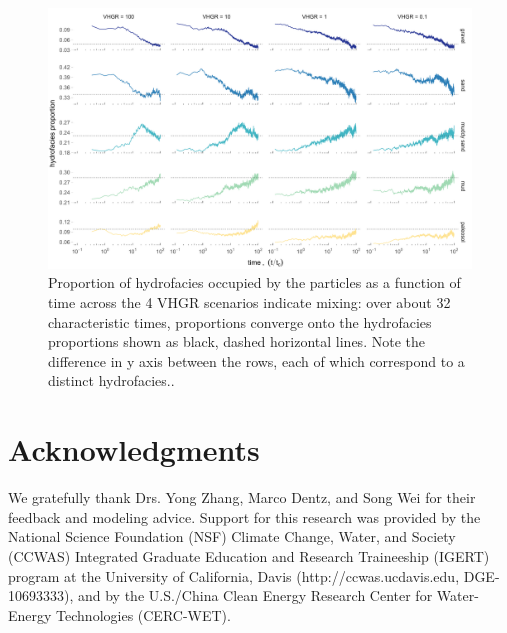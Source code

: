 \begin{figure}[H]
  \includegraphics[width=\textwidth]{ch4_appendix_figs/phf_over_time_00_03_ai.pdf}
  \caption{Proportion of hydrofacies occupied by the particles as a function of time across the 4 VHGR scenarios indicate mixing: over about 32 characteristic times, proportions converge onto the hydrofacies proportions shown as black, dashed horizontal lines. Note the difference in y axis between the rows, each of which correspond to a distinct hydrofacies..}
  \label{ap_c_heads_vhgr}
\end{figure}



\clearpage



\section{Acknowledgments}

We gratefully thank Drs. Yong Zhang, Marco Dentz, and Song Wei for their feedback and modeling advice. Support for this research was provided by the National Science Foundation (NSF) Climate Change, Water, and Society (CCWAS) Integrated Graduate Education and Research Traineeship (IGERT) program at the University of California, Davis (http://ccwas.ucdavis.edu, DGE-10693333), and by the U.S./China Clean Energy Research Center for Water-Energy Technologies (CERC-WET). %




\clearpage